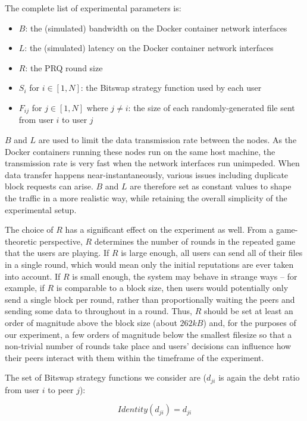 The complete list of experimental parameters is:

\begin{itemize}
\item
    $B$: the (simulated) bandwidth on the Docker container network interfaces
\item
    $L$: the (simulated) latency on the Docker container network interfaces
\item
    $R$: the PRQ round size
\item
    $S_{i}$ for $i \in [1, N]$: the Bitswap strategy function used by each user
\item
    $F_{ij}$ for $j \in [1, N]$ where $j \neq i$: the size of each
    randomly-generated file sent from user $i$ to user $j$
\end{itemize}

$B$ and $L$ are used to limit the data transmission rate between the nodes. As the
Docker containers running these nodes run on the same host machine, the transmission
rate is very fast when the network interfaces run unimpeded. When data transfer happens
near-instantaneously, various issues including duplicate block requests can arise.
$B$ and $L$ are therefore set as constant values to shape the traffic in a more realistic
way, while retaining the overall simplicity of the experimental setup.

The choice of $R$ has a significant effect on the experiment as well. From a game-theoretic
perspective, $R$ determines the number of rounds in the repeated game that the users are
playing. If $R$ is large enough, all users can send all of their files in a single round,
which would mean only the initial reputations are ever taken into account. If $R$ is small
enough, the system may behave in strange ways -- for example, if $R$ is comparable to a
block size, then users would potentially only send a single block per round, rather than
proportionally waiting the peers and sending some data to throughout in a round. Thus,
$R$ should be set at least an order of magnitude above the block size (about $262 kB$)
and, for the purposes of our experiment, a few orders of magnitude below the smallest
filesize so that a non-trivial number of rounds take place and users' decisions can
influence how their peers interact with them within the timeframe of the experiment.

The set of Bitswap strategy functions we consider are ($d_{ji}$ is again the debt ratio
from user $i$ to peer $j$):

\begin{equation}
    Identity(d_{ji}) = d_{ji}
\end{equation}

